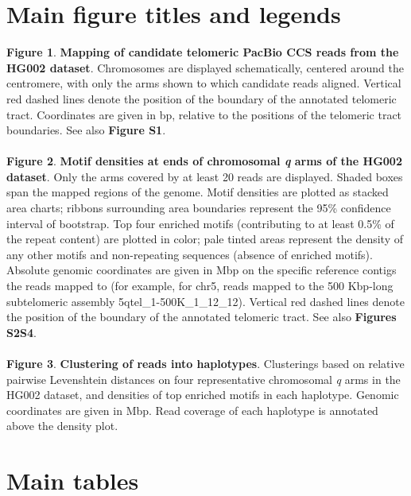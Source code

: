 \documentclass{article}
\begin{document}
\section*{Main figure titles and legends} 

\textbf{Figure 1}.
\textbf{Mapping of candidate telomeric PacBio CCS reads from the HG002 dataset}.
Chromosomes are displayed schematically, centered around the centromere, with only the arms shown to which candidate reads aligned.
Vertical red dashed lines denote the position of the boundary of the annotated telomeric tract.
Coordinates are given in bp, relative to the positions of the telomeric tract boundaries.
See also \textbf{Figure S1}.
\\~\\
\textbf{Figure 2}.
\textbf{Motif densities at ends of chromosomal \textit{q} arms of the HG002 dataset}.
Only the arms covered by at least 20 reads are displayed.
Shaded boxes span the mapped regions of the genome.
Motif densities are plotted as stacked area charts; ribbons surrounding area boundaries represent the 95\% confidence interval of bootstrap.
Top four enriched motifs (contributing to at least 0.5\% of the repeat content) are plotted in color; pale tinted areas represent the density of any other motifs and non-repeating sequences (absence of enriched motifs).
Absolute genomic coordinates are given in Mbp on the specific reference contigs the reads mapped to (for example, for chr5, reads mapped to the 500 Kbp-long subtelomeric assembly \mbox{5qtel\_1-500K\_1\_12\_12}).
Vertical red dashed lines denote the position of the boundary of the annotated telomeric tract.
See also \textbf{Figures S2\textendash{}S4}.
\\~\\
\textbf{Figure 3}.
\textbf{Clustering of reads into haplotypes}.
Clusterings based on relative pairwise Levenshtein distances on four representative chromosomal \textit{q} arms in the HG002 dataset, and densities of top enriched motifs in each haplotype.
Genomic coordinates are given in Mbp.
Read coverage of each haplotype is annotated above the density plot.

\pagebreak
\section*{Main tables} 


\end{document}
